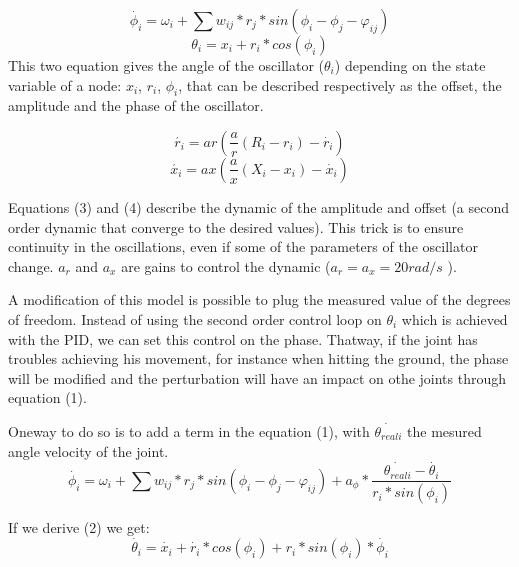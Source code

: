 \begin{equation*}
    \dot{\phi_i} = \omega_i + \sum{w_{ij} * r_j * sin(\phi_i - \phi_j - \varphi_{ij})} \tag{1}
\end{equation*}
\begin{equation*}
        \theta_i = x_i + r_i * cos(\phi_i)  \tag{2}
\end{equation*}
This two equation gives the angle of the oscillator ($\theta_i$) depending on the state variable of a node: $x_i$, $r_i$, $\phi_i$, that can be described respectively as the offset, the amplitude and the phase of the oscillator.

\begin{equation*}
    \acute{r_i} = ar(\frac ar (R_i - r_i) - \dot{r_i}) \tag{3}
\end{equation*}
\begin{equation*}
    \acute{x_i} = ax(\frac ax (X_i - x_i) - \dot{x_i}) \tag{4}
\end{equation*}

Equations (3) and (4) describe the dynamic of the amplitude and offset (a second order dynamic that converge to the desired values). This trick is to ensure continuity in the oscillations, even if some of the parameters of the oscillator change. $a_r$ and $a_x$ are gains to control the dynamic ($a_r = a_x = 20 rad/s$  \cite{sproewitz}). 


A modification of this model is possible to plug the measured value of the degrees of freedom. Instead of using the second order control loop on $\theta_i$ which is achieved with the PID, we can set this control on the phase. Thatway, if the joint has troubles achieving his movement, for instance when hitting the ground, the phase will be modified and the perturbation will have an impact on othe joints through equation (1).

Oneway to do so is to add a term in the equation (1), with $\dot{\theta_{reali}}$ the mesured angle velocity of the joint. 
\begin{equation*}
    \dot{\phi_i} = \omega_i + \sum{w_{ij} * r_j * sin(\phi_i - \phi_j - \varphi_{ij}) + a_{\phi} * \frac {\dot{\theta_{reali}} - \dot{\theta_i}} {r_i * sin (\phi_i)}} \tag{1}
\end{equation*}

If we derive (2) we get: 
\begin{equation*}
    \dot{\theta_i} = \dot{x_i} + \dot{r_i} * cos(\phi_i) + r_i * sin(\phi_i) * \dot{\phi_i} \tag{2'}
\end{equation*}

